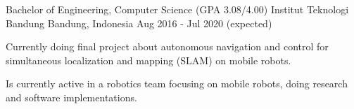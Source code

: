 

\begin{cventries}

  \cventry
    {Bachelor of Engineering, Computer Science (GPA 3.08/4.00)} %
    {Institut Teknologi Bandung} %
    {Bandung, Indonesia} %
    {Aug 2016 - Jul 2020 (expected)} %
    {
   	  \begin{cvitems}
		  \item {Currently doing final project about autonomous navigation and control for simultaneous localization and mapping (SLAM) on mobile robots.}
          \item {Is currently active in a robotics team focusing on mobile robots, doing research and software implementations.}
   	  \end{cvitems}
    }

\end{cventries}
